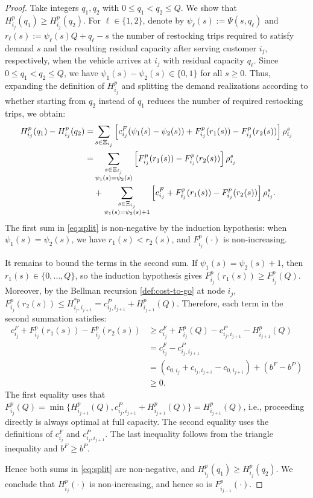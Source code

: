 \documentclass{article}
\begin{document}
\begin{proof}
{Take integers $q_1,q_2$ with $0\le q_1<q_2\le Q$. We show that $H^p_{i_j}(q_1)\ge H^p_{i_j}(q_2)$. For $\ell\in\{1,2\}$, denote by $\psi_\ell(s):=\Psi(s,q_\ell)$ and $r_\ell(s):=\psi_\ell(s)Q+q_\ell-s$ the number of restocking trips required to satisfy demand $s$ and the resulting residual capacity after serving customer $i_j$, respectively, when the vehicle arrives at $i_j$ with residual capacity $q_\ell$. Since $0\le q_1<q_2\le Q$, we have $\psi_1(s)-\psi_2(s)\in\{0,1\}$ for all $s\ge 0$. Thus, expanding the definition of $H^p_{i_j}$ and splitting the demand realizations according to whether starting from $q_2$ instead of $q_1$ reduces the number of required restocking trips, we obtain:
\begin{align}
H^p_{i_j}(q_1)-H^p_{i_j}(q_2)
=&
\sum_{s\in\Xi_{i_j}}
\left[
c^F_{i_j}(\psi_1(s)-\psi_2(s))
+
F^p_{i_j}(r_1(s))-F^p_{i_j}(r_2(s))
\right]\rho_{i_j}^s
\notag\\
=&
\sum_{\substack{s\in\Xi_{i_j}\\ \psi_1(s)=\psi_2(s)}}
\left[
F^p_{i_j}(r_1(s))-F^p_{i_j}(r_2(s))
\right]\rho_{i_j}^s
\notag\\
&+
\sum_{\substack{s\in\Xi_{i_j}\\ \psi_1(s)=\psi_2(s)+1}}
\left[
c^F_{i_j}
+
F^p_{i_j}(r_1(s))-F^p_{i_j}(r_2(s))
\right]\rho_{i_j}^s .
\label{eq:split}
\end{align}
The first sum in \eqref{eq:split} is non-negative by the induction hypothesis: when
$\psi_1(s)=\psi_2(s)$, we have $r_1(s)<r_2(s)$, and
$F^p_{i_j}(\cdot)$ is non-increasing.

It remains to bound the terms in the second sum. If
$\psi_1(s)=\psi_2(s)+1$, then $r_1(s)\in\{0,\dots,Q\}$, so the induction hypothesis
gives $F^p_{i_j}(r_1(s))\ge F^p_{i_j}(Q)$.
Moreover, by the Bellman recursion \eqref{def:cost-to-go} at node $i_j$, $F^p_{i_j}(r_2(s))
\le
H^{*p}_{i_j,i_{j+1}}
=
c^P_{i_j,i_{j+1}}+H^p_{i_{j+1}}(Q)$.
Therefore, each term in the second summation satisfies:
\begin{align*}
    c^F_{i_j} + F^p_{i_j}(r_1(s))-F^p_{i_j}(r_2(s)) & \geq c^F_{i_j}
+
F^p_{i_j}(Q)
-
c^P_{i_j,i_{j+1}}
-
H^p_{i_{j+1}}(Q) \\
&= c^F_{i_j}-c^P_{i_j,i_{j+1}} \\
&= \left(c_{0,i_j}+c_{i_j,i_{j+1}}-c_{0,i_{j+1}}\right)
+
\left(b^F-b^P\right) \\
& \geq 0.
\end{align*}
The first equality uses that $F^p_{i_j}(Q)=\min\{H^p_{i_{j+1}}(Q),c^P_{i_j, i_{j+1}} + H^p_{i_{j+1}}(Q)\}=H^p_{i_{j+1}}(Q)$, i.e., proceeding directly is always optimal at full capacity. The second equality uses the definitions of $c^F_{i_j}$ and $c^P_{i_j,i_{j+1}}$. The last inequality follows from the triangle inequality and
$b^F\ge b^P$. 

Hence both sums in \eqref{eq:split} are non-negative, and
$H^p_{i_j}(q_1)\ge H^p_{i_j}(q_2)$. We conclude that $H_{i_j}^p(\cdot)$ is non-increasing, and hence so is $F^p_{i_{j-1}}(\cdot)$.
}
\end{proof}
\end{document}
